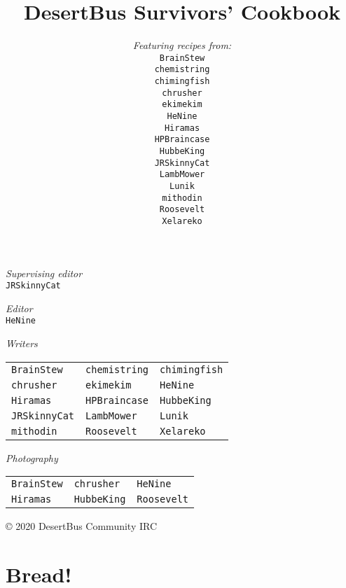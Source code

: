 \documentclass[12pt,a4paper,twoside]{book}
\title{DesertBus Survivors' Cookbook}
\author{\textit{Featuring recipes from:}\\
		\texttt{BrainStew}\\%
		\texttt{chemistring}\\%
		\texttt{chimingfish}\\%
		\texttt{chrusher}\\%
		\texttt{ekimekim}\\%
		\texttt{HeNine}\\%
		\texttt{Hiramas}\\%
		\texttt{HPBraincase}\\%
		\texttt{HubbeKing}\\%
		\texttt{JRSkinnyCat}\\%
		\texttt{LambMower}\\%
		\texttt{Lunik}\\%
		\texttt{mithodin}\\%
		\texttt{Roosevelt}\\%
		\texttt{Xelareko}
}
\begin{document}
	\frontmatter
	\maketitle

	\newpage

	\null
	\vfill

	\textit{Supervising editor}\\
	\texttt{JRSkinnyCat}

	\textit{Editor}\\
	\texttt{HeNine}


	\textit{Writers}\\

	\vspace{-1.9em}
	\hspace*{-0.45em}\begin{tabular}{lll}
	\texttt{BrainStew} &
	\texttt{chemistring} &
	\texttt{chimingfish}\\
	\texttt{chrusher} &
	\texttt{ekimekim} &
	\texttt{HeNine}\\
	\texttt{Hiramas} &
	\texttt{HPBraincase} &
	\texttt{HubbeKing}\\
	\texttt{JRSkinnyCat} &
	\texttt{LambMower} &
	\texttt{Lunik}\\
	\texttt{mithodin} &
	\texttt{Roosevelt} &
	\texttt{Xelareko}
	\end{tabular}

	\textit{Photography}\\

	\vspace{-1.9em}
	\hspace*{-0.45em}\begin{tabular}{lll}
		\texttt{BrainStew} &
		\texttt{chrusher} &
		\texttt{HeNine}\\
		\texttt{Hiramas} &
		\texttt{HubbeKing} &
		\texttt{Roosevelt}
	\end{tabular}

	\vspace{1in}
	© 2020 DesertBus Community IRC

	\newpage
	\newpage
	\tableofcontents
	\clearpage

	\mainmatter
	\chapter{Bread!}
	\clearpage

	
	\clearpage
	
	\clearpage
	
	\clearpage
\end{document}
